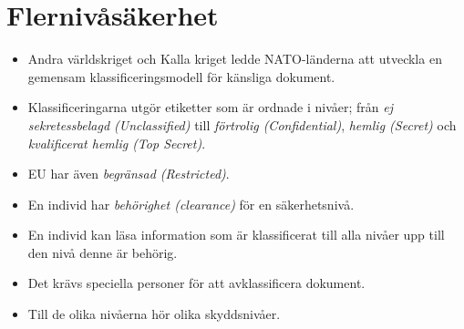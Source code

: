 \mode*




\section{Flernivåsäkerhet}

\begin{frame}{\insertsubsectionhead}
  \begin{itemize}
    \item Andra världskriget och Kalla kriget ledde NATO-länderna att utveckla 
      en gemensam klassificeringsmodell för känsliga dokument.
    \item Klassificeringarna utgör etiketter som är ordnade i nivåer; från 
      \emph{ej sekretessbelagd (Unclassified)} till \emph{förtrolig 
      (Confidential)}, \emph{hemlig (Secret)} och \emph{kvalificerat hemlig 
      (Top Secret)}.
    \item EU har även \emph{begränsad (Restricted)}.
    \item En individ har \emph{behörighet (clearance)} för en säkerhetsnivå.
  \end{itemize}
\end{frame}
\begin{frame}{\insertsubsectionhead}
  \begin{itemize}
    \item En individ kan läsa information som är klassificerat till alla nivåer 
      upp till den nivå denne är behörig.
    \item Det krävs speciella personer för att avklassificera dokument.
    \item Till de olika nivåerna hör olika skyddsnivåer.
  \end{itemize}
\end{frame}
